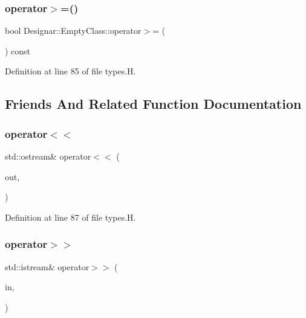 \subsubsection{\texorpdfstring{operator$>$=()}{operator>=()}}
{\footnotesize\ttfamily bool Designar\+::\+Empty\+Class\+::operator$>$= (\begin{DoxyParamCaption}\item[{const \hyperlink{class_designar_1_1_empty_class}{Empty\+Class} \&}]{ }\end{DoxyParamCaption}) const\hspace{0.3cm}{\ttfamily [inline]}}



Definition at line 85 of file types.\+H.



\subsection{Friends And Related Function Documentation}
\mbox{\label{class_designar_1_1_empty_class_a1927797e0167a693cd74b5227218f196}} 
\subsubsection{\texorpdfstring{operator$<$$<$}{operator<<}}
{\footnotesize\ttfamily std\+::ostream\& operator$<$$<$ (\begin{DoxyParamCaption}\item[{std\+::ostream \&}]{out,  }\item[{const \hyperlink{class_designar_1_1_empty_class}{Empty\+Class} \&}]{ }\end{DoxyParamCaption})\hspace{0.3cm}{\ttfamily [friend]}}



Definition at line 87 of file types.\+H.

\mbox{\label{class_designar_1_1_empty_class_aa3fc576ae898cf56f66f6ebf12251803}} 
\subsubsection{\texorpdfstring{operator$>$$>$}{operator>>}}
{\footnotesize\ttfamily std\+::istream\& operator$>$$>$ (\begin{DoxyParamCaption}\item[{std\+::istream \&}]{in,  }\item[{\hyperlink{class_designar_1_1_empty_class}{Empty\+Class} \&}]{ }\end{DoxyParamCaption})\hspace{0.3cm}{\ttfamily [friend]}}



